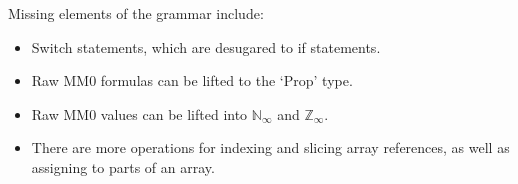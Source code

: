 \documentclass[acmsmall,nonacm]{acmart}
\newcommand*{\N}{\mathbb{N}}
\newcommand*{\Z}{\mathbb{Z}}
\begin{document}
Missing elements of the grammar include:
\begin{itemize}
  \item Switch statements, which are desugared to if statements.
  \item Raw MM0 formulas can be lifted to the `Prop' type.
  \item Raw MM0 values can be lifted into $\N_\infty$ and $\Z_\infty$.
  \item There are more operations for indexing and slicing array references, as well as assigning to parts of an array.
\end{itemize}
\end{document}
